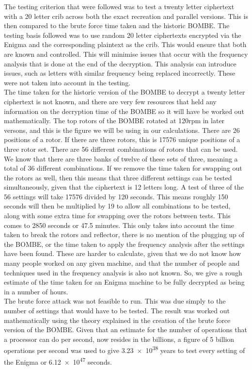 \documentclass[12pt,a4paper]{article}
\begin{document}
The testing criterion that were followed was to test a twenty letter ciphertext with a 20 letter crib across both the exact recreation and parallel versions. This is then compared to the brute force time taken and the historic BOMBE. The testing basis followed was to use random 20 letter ciphertexts encrypted via the Enigma and the corresponding plaintext as the crib. This would ensure that both are known and controlled. This will minimise issues that occur with the frequency analysis that is done at the end of the decryption. This analysis can introduce issues, such as letters with similar frequency being replaced incorrectly. These were not taken into account in the testing.\\

The time taken for the historic version of the BOMBE to decrypt a twenty letter ciphertext is not known, and there are very few resources that held any information on the decryption time of the BOMBE so it will have be worked out mathematically. The top rotors of the BOMBE rotated at 120rpm in later versons, and this is the figure we will be using in our calculations. There are 26 positions of a rotor. If there are three rotors, this is 17576 unique positions of a three rotor set. There are 56 different combinations of rotors that can be used. We know that there are three banks of twelve of these sets of three, meaning a total of 36 different combinations. If we remove the time taken for swapping out the rotors as well, then this means that three different settings can be tested simultaneously, given that the ciphertext is 12 letters long. A test of three of the 56 settings will take 17576 divided by 120 seconds. This means roughly 150 seconds will then be multiplied by 19 to allow all combinations to be tested, along with some extra time for swapping over the rotors between tests. This comes to 2850 seconds or 47.5 minutes. This only takes into account the time taken to break the rotors and reflector, there is no mention of the plugging up of the BOMBE, or the time taken to apply the frequency analysis after the settings have been found. These are harder to calculate, given that we do not know how many people worked on any given machine, and that the number of people and techniques used in the frequency analysis is also not known. So, we give a rough estimate of the time taken for an Enigma machine to be fully decrypted as being in a number of hours.\\

The brute force attack was not feasible to run. This was due simply to the number of settings that would have to be tested. The result was worked out mathematically using the theory explained in the creation of the brute force version of the BOMBE. Given that an estimate for the number of operations that a processor can do per second, now resides in the billions, a figure of 5 billion operations per second was used to give  \num{3.23e38} years to test every setting of the Enigma or  \num{6.12e47} seconds.\\
\end{document}
